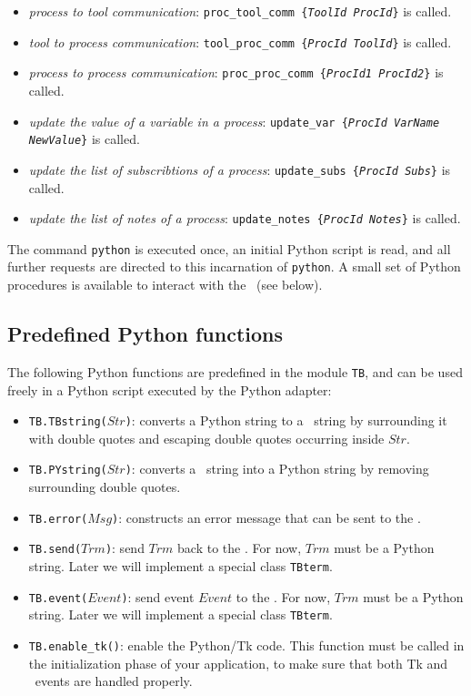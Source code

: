 \begin{itemize}
\begin{itemize}
  \item \emph{process to tool communication}:
    \texttt{proc\_tool\_comm \{\emph{ToolId} \emph{ProcId}\}} is
    called.
  \item \emph{tool to process communication}:
    \texttt{tool\_proc\_comm \{\emph{ProcId} \emph{ToolId}\}} is
    called.
  \item \emph{process to process communication}:
    \texttt{proc\_proc\_comm \{\emph{ProcId1} \emph{ProcId2}\}} is
    called.
  \item \emph{update the value of a variable in a process}:
    \texttt{update\_var \{\emph{ProcId} \emph{VarName}
      \emph{NewValue}\}} is called.
  \item \emph{update the list of subscribtions of a process}:
    \texttt{update\_subs \{\emph{ProcId} \emph{Subs}\}} is called.
  \item \emph{update the list of notes of a process}:
    \texttt{update\_notes \{\emph{ProcId} \emph{Notes}\}} is called.
  \end{itemize}
\end{itemize}

\noindent The command {\tt python} is executed once, an initial Python script
is read, and all further requests are directed to this incarnation
of {\tt python}. A small set of Python procedures is available to interact
with the \TB\ (see below).

\subsection{\label{Python-functions}Predefined Python functions}
The following Python functions are predefined in the module {\tt TB},
and can be used freely in a Python script executed by the Python adapter:
\begin{itemize}
\item {\tt TB.TBstring($Str$)\/}: converts a Python string to a \TB\ string by
surrounding it with double quotes and escaping double quotes occurring
inside $Str$.

\item {\tt TB.PYstring($Str$)\/}: converts a \TB\ string into  a Python string
by removing surrounding double quotes.

\item {\tt TB.error($Msg$)\/}: constructs an error message that can be sent
to the \TB.

\item {\tt TB.send($Trm$)\/}: send $Trm$ back to the \TB. For now, $Trm$ must
be a Python string. Later we will implement a special class {\tt TBterm}.

\item {\tt TB.event($Event$)\/}: send event $Event$ to the \TB. For now, $Trm$ must
be a Python string. Later we will implement a special class {\tt TBterm}.

\item {\tt TB.enable\_tk()\/}: enable the Python/Tk code. 
This function must be called in the initialization phase of your
application, to make sure that both Tk and \TB\ events are handled properly.

\end{itemize}

